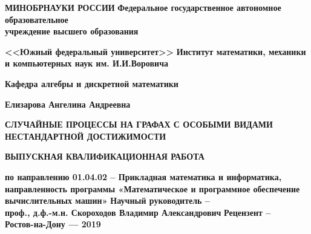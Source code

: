 \thispagestyle{empty}
\vskip1cm
\begin{center}
\textbf{МИНОБРНАУКИ РОССИИ}
\vskip14pt
\textbf{Федеральное государственное автономное образовательное \\учреждение
высшего образования}

\textbf{<<Южный федеральный университет>>}
\vskip14pt
\textbf{\large Институт математики, механики и компьютерных наук им. И.И.Воровича}

\textbf{Кафедра алгебры и дискретной математики}

\vskip1.25cm
\textbf{\LARGE{Елизарова Ангелина Андреевна}}


\author{
  LastName1, FirstName1\\
  \texttt{first1.last1@xxxxx.com}
  \and
  LastName2, FirstName2\\
  \texttt{first2.last2@xxxxx.com}
}

\vskip1.25cm

\textbf{\LARGE СЛУЧАЙНЫЕ ПРОЦЕССЫ НА ГРАФАХ С ОСОБЫМИ ВИДАМИ НЕСТАНДАРТНОЙ ДОСТИЖИМОСТИ}

\vskip2cm

\textbf{ВЫПУСКНАЯ КВАЛИФИКАЦИОННАЯ РАБОТА}

\textbf{\large{по направлению 01.04.02 – Прикладная математика и информатика, 
направленность программы «Математическое и программное обеспечение вычислительных машин»}}
\vskip1cm
\textbf{Научный руководитель --\\
проф., д.ф.-м.н. Скороходов Владимир Александрович}
\vskip1cm
\textbf{Рецензент --\\
	}
\textbf{Ростов-на-Дону --- 2019}
\end{center}
\newpage
